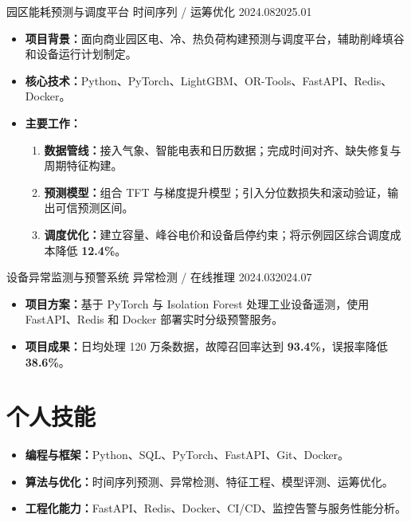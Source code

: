 \documentclass{claritycv}
\begin{document}
\resumeentry
  {\hypertarget{proj-energy}{园区能耗预测与调度平台}}
  {时间序列 / 运筹优化}
  {2024.08}{2025.01}
\begin{itemize}
  \item \textbf{项目背景：}面向商业园区电、冷、热负荷构建预测与调度平台，辅助削峰填谷和设备运行计划制定。
  \item \textbf{核心技术：}Python、PyTorch、LightGBM、OR-Tools、FastAPI、Redis、Docker。
  \item \textbf{主要工作：}
    \begin{enumerate}
      \item \textbf{数据管线：}接入气象、智能电表和日历数据；完成时间对齐、缺失修复与周期特征构建。
      \item \textbf{预测模型：}组合 TFT 与梯度提升模型；引入分位数损失和滚动验证，输出可信预测区间。
      \item \textbf{调度优化：}建立容量、峰谷电价和设备启停约束；将示例园区综合调度成本降低 \textcolor{ResumeAccent}{\textbf{12.4\%}}。
    \end{enumerate}
\end{itemize}


\resumeentry
  {\hypertarget{proj-monitoring}{设备异常监测与预警系统}}
  {异常检测 / 在线推理}
  {2024.03}{2024.07}
\begin{itemize}
  \item \textbf{项目方案：}基于 PyTorch 与 Isolation Forest 处理工业设备遥测，使用 FastAPI、Redis 和 Docker 部署实时分级预警服务。
  \item \textbf{项目成果：}日均处理 120 万条数据，故障召回率达到 \textcolor{ResumeAccent}{\textbf{93.4\%}}，误报率降低 \textcolor{ResumeAccent}{\textbf{38.6\%}}。
\end{itemize}


\section{个人技能}
\begin{itemize}
  \item \textbf{编程与框架：}Python、SQL、PyTorch、FastAPI、Git、Docker。
  \item \textbf{算法与优化：}时间序列预测、异常检测、特征工程、模型评测、运筹优化。
  \item \textbf{工程化能力：}FastAPI、Redis、Docker、CI/CD、监控告警与服务性能分析。
\end{itemize}
\end{document}
